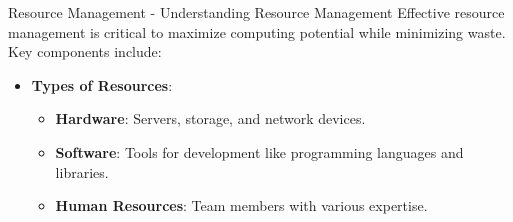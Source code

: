 \documentclass[aspectratio=169]{beamer}
\begin{document}
\begin{frame}[fragile]{Resource Management - Understanding Resource Management}
  Effective resource management is critical to maximize computing potential while minimizing waste. Key components include:
  \begin{itemize}
    \item \textbf{Types of Resources}:
    \begin{itemize}
      \item \textbf{Hardware}: Servers, storage, and network devices.
      \item \textbf{Software}: Tools for development like programming languages and libraries.
      \item \textbf{Human Resources}: Team members with various expertise.
    \end{itemize}
  \end{itemize}
\end{frame}
\end{document}
